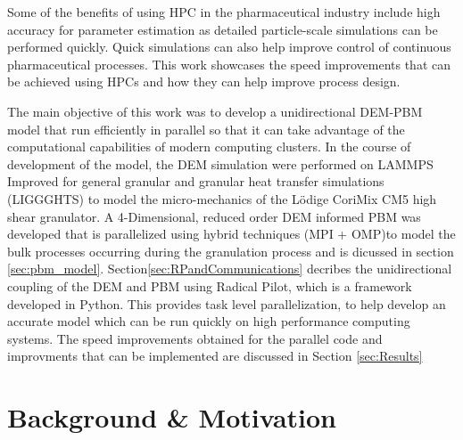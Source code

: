 \documentclass[preprint,11pt,authoryear]{elsarticle}
\begin{document}


Some of the benefits of using
HPC in the pharmaceutical industry include high accuracy for parameter estimation as detailed 
particle-scale simulations can be performed quickly. Quick simulations can also help 
improve control of continuous pharmaceutical processes. This work showcases the speed improvements 
that can be achieved using HPCs and how they can help improve process design.

The main objective of this work was to develop a unidirectional DEM-PBM model that run efficiently in 
parallel so that it can take advantage of the computational capabilities of  modern computing 
clusters. In the course of development of the model, the DEM simulation were performed on 
LAMMPS Improved for general granular and granular heat transfer simulations (LIGGGHTS) \citep{Kloss2012} to  
model the micro-mechanics of the L\"{o}dige CoriMix CM5 high shear granulator. A 4-Dimensional, 
reduced order DEM informed PBM was developed that is parallelized using hybrid techniques 
(MPI + OMP)to model the bulk processes occurring during the granulation process and 
is dicussed in section \ref{sec:pbm_model}. Section\ref{sec:RPandCommunications} decribes 
the unidirectional coupling of the DEM and PBM using Radical Pilot, which is a 
framework developed in Python. This provides task level parallelization, to help develop 
an accurate model which can be run quickly on high performance computing systems. The speed
improvements obtained for the parallel code and improvments that can be implemented are discussed
in Section \ref{sec:Results}


\section{Background \& Motivation}
\end{document}
